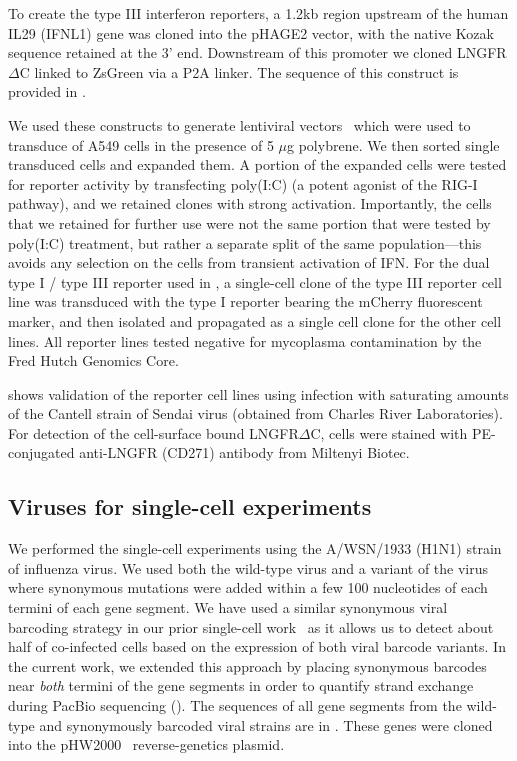\documentclass[9pt,lineno]{elife}
\begin{document}
To create the type III interferon reporters, a 1.2kb region upstream of the human IL29 (IFNL1) gene was cloned into the pHAGE2 vector, with the native Kozak sequence retained at the 3' end. 
Downstream of this promoter we cloned LNGFR$\Delta$C linked to ZsGreen via a P2A linker.
The sequence of this construct is provided in .
 
We used these constructs to generate lentiviral vectors~\citep{oconnell2010lentiviral} which were used to transduce of A549 cells in the presence of 5 $\mu$g polybrene.
We then sorted single transduced cells and expanded them.
A portion of the expanded cells were tested for reporter activity by transfecting poly(I:C) (a potent agonist of the RIG-I pathway), and we retained clones with strong activation.
Importantly, the cells that we retained for further use were not the same portion that were tested by poly(I:C) treatment, but rather a separate split of the same population---this avoids any selection on the cells from transient activation of IFN.
For the dual type I / type III reporter used in , a single-cell clone of the type III reporter cell line was transduced with the type I reporter bearing the mCherry fluorescent marker, and then isolated and propagated as a single cell clone for the other cell lines.
All reporter lines tested negative for mycoplasma contamination by the Fred Hutch Genomics Core.

 shows validation of the reporter cell lines using infection with saturating amounts of the Cantell strain of Sendai virus (obtained from Charles River Laboratories).
For detection of the cell-surface bound LNGFR$\Delta$C, cells were stained with PE-conjugated anti-LNGFR (CD271) antibody from Miltenyi Biotec.

\subsection{Viruses for single-cell experiments}
We performed the single-cell experiments using the A/WSN/1933 (H1N1) strain of influenza virus.
We used both the wild-type virus and a variant of the virus where synonymous mutations were added within a few 100 nucleotides of each termini of each gene segment.
We have used a similar synonymous viral barcoding strategy in our prior single-cell work~\citep{russell2018extreme} as it allows us to detect about half of co-infected cells based on the expression of both viral barcode variants.
In the current work, we extended this approach by placing synonymous barcodes near \emph{both} termini of the gene segments in order to quantify strand exchange during PacBio sequencing ().
The sequences of all gene segments from the wild-type and synonymously barcoded viral strains are in .
These genes were cloned into the pHW2000~\citep{hoffmann2000dna} reverse-genetics plasmid.
\end{document}
